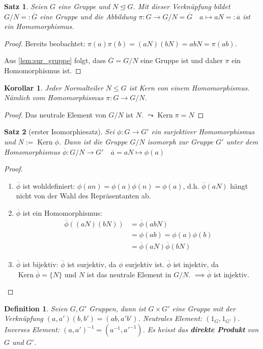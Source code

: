 \documentclass{article}
\theoremstyle{plain}
\newtheorem{definition}{Definition}
\newtheorem{theorem}{Satz}
\newtheorem{corollary}{Korollar}
\renewcommand{\ker}{\mathop{\mathrm{Kern}}}
\newcommand{\defn}[1]{\textbf{#1}}
\newcommand{\ug}{\leq}
\newcommand{\normal}{\trianglelefteq}
\begin{document}
\begin{theorem}
    Seien $G$ eine Gruppe und $N\normal G$.
    Mit dieser Verknüpfung bildet $G/N =:\overline G$ eine Gruppe und die Abbildung $\pi\colon G\to G/N=\overline G \quad a\mapsto aN=: \overline a$ ist ein Homomorphismus.
\end{theorem}
\begin{proof}
    Bereits beobachtet: $\pi(a)\pi(b)=(aN)(bN)=abN=\pi(ab)$.

    Aus \cref{lem:sur_gruppe} folgt, dass $\overline G=G/N$ eine Gruppe ist und daher $\pi$ ein Homomorphismus ist.
\end{proof}

\begin{corollary}
    Jeder Normalteiler $N\ug G$ ist Kern von einem Homomorphismus. Nämlich vom Homomorphismus $\pi\colon G\to G/N$.
\end{corollary}
\begin{proof}
    Das neutrale Element von $G/N$ ist $N$. $\leadsto\ker \pi=N$
\end{proof}
\begin{theorem}[erster Isomorphiesatz]\label{stz:isoeins}
    Sei $\phi\colon G\to G'$ ein surjektiver Homomorphismus und $N:=\ker\phi$. Dann ist die Gruppe $G/N$ isomorph zur Gruppe $G'$ unter dem Homomorphismus $\overline\phi\colon G/N\to G'\quad \overline a=aN\mapsto\phi(a)$
\end{theorem}
\begin{proof}
    \begin{enumerate}
        \item $\overline\phi$ ist wohldefiniert: $\phi(an)=\phi(a)\phi(n)=\phi(a)$, d.h. $\overline\phi(aN)$ hängt nicht von der Wahl des Repräsentanten ab.
        \item $\overline\phi$ ist ein Homomorphismus: 
        \begin{align*}
            \overline\phi((aN)(bN))&=\overline\phi(abN)\\
            &=\phi(ab)=\phi(a)\phi(b)\\
            &=\overline\phi(aN)\overline\phi(bN)
        \end{align*}
        \item $\overline\phi$ ist bijektiv: $\overline\phi$ ist surjektiv, da $\phi$ surjektiv ist. $\overline\phi$ ist injektiv, da $\ker\overline\phi=\{N\}$ und $N$ ist das neutrale Element in $G/N$. $\implies\overline\phi$ ist injektiv.
    \end{enumerate}
\end{proof}
\begin{definition}
    Seien $G,G'$ Gruppen, dann ist $G\times G'$ eine Gruppe mit der Verknüpfung $(a,a')(b,b')=(ab,a'b')$.
    Neutrales Element: $(1_G,1_{G'})$.
    Inverses Element: $(a,a')^{-1}=(a^{-1},a'^{-1})$.
    Es heisst das \defn{direkte Produkt} von $G$ und $G'$.
\end{definition}
\end{document}
